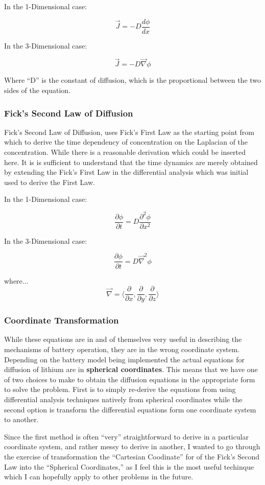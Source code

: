 \documentclass[12pt]{article}
\begin{document}
In the 1-Dimensional case:

\[ \vec{J} = -D \frac{d\phi}{dx} \]

In the 3-Dimensional case:

\[ \vec{J} = -D \vec{\nabla}\phi \]

Where ``D'' is the constant of diffusion, which is the proportional between the two sides of the equation.

\subsubsection{Fick's Second Law of Diffusion}
Fick's Second Law of Diffusion, uses Fick's First Law as the starting point from which to derive the time dependency of concentration on the Laplacian of the concentration. While there is a reasonable derivation which could be inserted here. It is is sufficient to understand that the time dynamics are merely obtained by extending the Fick's First Law in the differential analysis which was initial used to derive the First Law.

In the 1-Dimensional case:

\[\frac{\partial{\phi}}{\partial{t}} = D \frac{\partial^2{\phi}}{\partial{x^2}}   \]

In the 3-Dimensional case:

\[\frac{\partial{\phi}}{\partial{t}} = D\vec{\nabla}^2\phi \]

where...  \[ \vec{\nabla} = \langle \frac{\partial{}}{\partial{x}}, \frac{\partial{}}{\partial{y}}, \frac{\partial{}}{\partial{z}} \rangle \]

\subsubsection{Coordinate Transformation}

While these equations are in and of themselves very useful in describing the mechanisms of battery operation, they are in the wrong coordinate system. Depending on the battery model being implemented the actual equations for diffusion of lithium are in \textbf{spherical coordinates}. This means that we have one of two choices to make to obtain the diffusion equations in the appropriate form to solve the problem. First is to simply re-derive the equations from using differential analysis techniques natively from spherical coordinates while the second option is transform the differential equations form one coordinate system to another.

Since the first method is often ``very'' straightforward to derive in a particular coordinate system, and rather messy to derive in another, I wanted to go through the exercise of transformation the ``Cartesian Coodinate'' for of the Fick's Second Law into the ``Spherical Coordinates,'' as I feel this is the most useful techinque which I can hopefully apply to other problems in the future.
\end{document}
